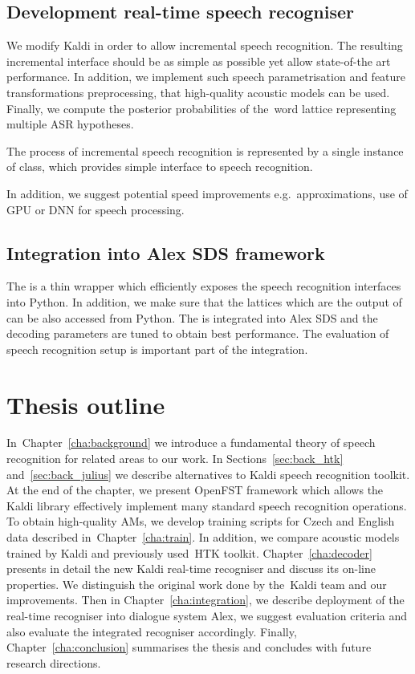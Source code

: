 \subsection{Development real-time speech recogniser} 
\label{sub:compare_rt}

We modify Kaldi  in order to allow incremental speech recognition.
The resulting incremental interface should be as simple as possible yet allow state-of-the art performance.
In addition, we implement such speech parametrisation and feature transformations preprocessing, that high-quality acoustic models can be used.
Finally, we compute the posterior probabilities of the~word lattice representing multiple \ac{ASR} hypotheses.

The process of incremental speech recognition is represented by a single instance of  class,
which provides simple interface to speech recognition.

In addition, we suggest potential speed improvements e.g.\ approximations, use of \ac{GPU} 
or \ac{DNN} for speech processing\cite{vesely2013sequencediscriminative}.

\subsection[Integration into Alex \acs{SDS} framework]{Integration into Alex \acl{SDS} framework} 
\label{sub:integration}
The  is a thin wrapper which efficiently exposes the speech recognition interfaces  into Python.
In addition, we make sure that the lattices which are the output of  can be also accessed from Python.
The  is integrated into Alex \ac{SDS} and the decoding parameters are tuned to obtain best performance.
The evaluation of speech recognition setup is important part of the integration.

\section*{Thesis outline} 
In~Chapter~\ref{cha:background} we introduce a fundamental theory of speech recognition for related areas to our work.
In Sections~\ref{sec:back_htk} and~\ref{sec:back_julius} we describe alternatives to Kaldi speech recognition toolkit. 
At the end of the chapter, we present OpenFST framework which allows the Kaldi library effectively implement many standard speech recognition operations. 
To obtain high-quality \aclp{AM}, we develop training scripts for Czech and English data described in~Chapter~\ref{cha:train}. 
In addition, we compare acoustic models trained by Kaldi and previously used~\ac{HTK} toolkit. 
Chapter~\ref{cha:decoder} presents in detail the new Kaldi real-time recogniser and discuss its on-line properties.
We distinguish the original work done by the~Kaldi team and our improvements. 
Then in Chapter~\ref{cha:integration}, we describe deployment of the real-time recogniser into dialogue system Alex, we suggest evaluation criteria and also evaluate the integrated recogniser accordingly.
Finally, Chapter~\ref{cha:conclusion} summarises the thesis and concludes with future research directions.
